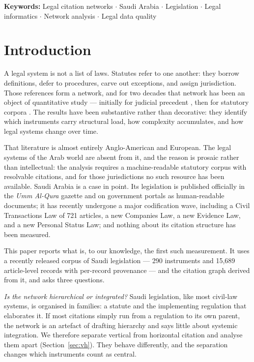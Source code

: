 \documentclass[sn-basic]{sn-jnl}%
\newcommand{\usingsnstyle}{}%
\newcommand{\corpuscite}{anon2026corpus}
\newcommand{\corpuscite}{almohammedi2026corpus}
\begin{document}
\ifdefined\usingsnstyle
{}
\else
\vspace{1em}\noindent\textbf{Keywords:} Legal citation networks $\cdot$ Saudi
Arabia $\cdot$ Legislation $\cdot$ Legal informatics $\cdot$ Network analysis
$\cdot$ Legal data quality
\vspace{1em}
\fi

\section{Introduction}
\label{sec:intro}

A legal system is not a list of laws. Statutes refer to one another:
they borrow definitions, defer to procedures, carve out exceptions, and
assign jurisdiction. Those references form a network, and for two decades
that network has been an object of quantitative study --- initially for
judicial precedent \citep{fowler2007network}, then for statutory corpora
\citep{katz2014complexity, coupette2021measuring}. The results have been
substantive rather than decorative: they identify which instruments carry
structural load, how complexity accumulates, and how legal systems change
over time.

That literature is almost entirely Anglo-American and European. The legal
systems of the Arab world are absent from it, and the reason is prosaic
rather than intellectual: the analysis requires a machine-readable statutory
corpus with resolvable citations, and for those jurisdictions no such
resource has been available. Saudi Arabia is a case in point. Its
legislation is published officially in the \emph{Umm Al-Qura} gazette and on
government portals as human-readable documents; it has recently undergone a
major codification wave, including a Civil Transactions Law of 721 articles,
a new Companies Law, a new Evidence Law, and a new Personal Status Law; and
nothing about its citation structure has been measured.

This paper reports what is, to our knowledge, the first such measurement. It
uses a recently released
corpus of Saudi legislation --- 290 instruments and 15{,}689 article-level
records with per-record provenance \citep{\corpuscite} --- and the
citation graph derived from it, and asks three questions.

\emph{Is the network hierarchical or integrated?} Saudi legislation, like
most civil-law systems, is organised in families: a statute and the
implementing regulation that elaborates it. If most citations simply run
from a regulation to its own parent, the network is an artefact of drafting
hierarchy and says little about systemic integration. We therefore separate
vertical from horizontal citation and analyse them apart
(Section~\ref{sec:vh}). They behave differently, and the separation changes
which instruments count as central.
\end{document}
